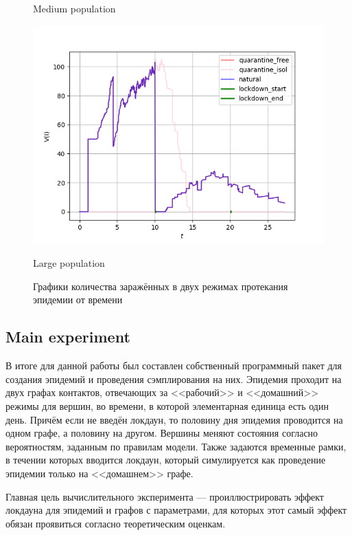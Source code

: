 \begin{figure}[h]
\begin{minipage}{0.49\linewidth}
			\centering
			Medium population
		\end{minipage}
		\begin{center}
			\begin{minipage}{0.5\linewidth}
			\includegraphics[width=\linewidth, keepaspectratio]{../figs/basic_experiment_big_population}
			
			\centering
			Large population
		\end{minipage}
		\end{center}
		\caption{Графики количества заражённых в двух режимах протекания эпидемии от времени}\label{pic:basic}
	\end{figure}

	\subsection*{Main experiment}
	
	В итоге для данной работы был составлен собственный программный пакет для создания эпидемий и проведения сэмплирования на них. Эпидемия проходит на двух графах контактов, отвечающих за <<рабочий>> и <<домашний>> режимы для вершин, во времени, в которой элементарная единица есть один день. Причём если не введён локдаун, то половину дня эпидемия проводится на одном графе, а половину на другом. Вершины меняют состояния согласно вероятностям, заданным по правилам модели. Также задаются временные рамки, в течении которых вводится локдаун, который симулируется как проведение эпидемии только на <<домашнем>> графе.
	
	Главная цель вычислительного эксперимента --- проиллюстрировать эффект локдауна для эпидемий и графов с параметрами, для которых этот самый эффект обязан проявиться согласно теоретическим оценкам. 
	
